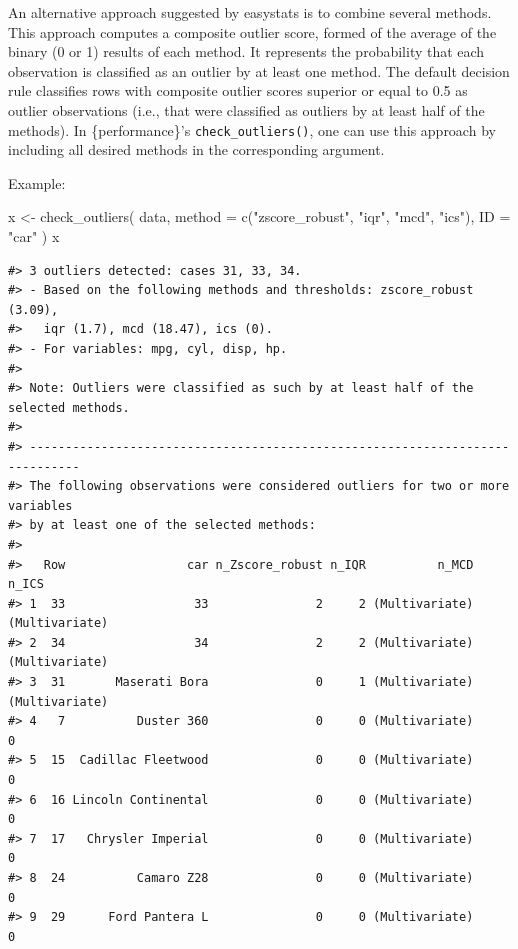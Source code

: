 \documentclass[
]{article}
\newenvironment{Shaded}{\begin{snugshade}}{\end{snugshade}}
\newcommand{\AttributeTok}[1]{\textcolor[rgb]{0.77,0.63,0.00}{#1}}
\newcommand{\FunctionTok}[1]{\textcolor[rgb]{0.00,0.00,0.00}{#1}}
\newcommand{\NormalTok}[1]{#1}
\newcommand{\OtherTok}[1]{\textcolor[rgb]{0.56,0.35,0.01}{#1}}
\newcommand{\StringTok}[1]{\textcolor[rgb]{0.31,0.60,0.02}{#1}}
\begin{document}
An alternative approach suggested by easystats is to combine several
methods. This approach computes a composite outlier score, formed of the
average of the binary (0 or 1) results of each method. It represents the
probability that each observation is classified as an outlier by at
least one method. The default decision rule classifies rows with
composite outlier scores superior or equal to 0.5 as outlier
observations (i.e., that were classified as outliers by at least half of
the methods). In \{performance\}'s \texttt{check\_outliers()}, one can
use this approach by including all desired methods in the corresponding
argument.

Example:

\begin{Shaded}
\begin{Highlighting}[]
\NormalTok{x }\OtherTok{\textless{}{-}} \FunctionTok{check\_outliers}\NormalTok{(}
\NormalTok{  data,}
  \AttributeTok{method =} \FunctionTok{c}\NormalTok{(}\StringTok{"zscore\_robust"}\NormalTok{, }\StringTok{"iqr"}\NormalTok{, }\StringTok{"mcd"}\NormalTok{, }\StringTok{"ics"}\NormalTok{),}
  \AttributeTok{ID =} \StringTok{"car"}
\NormalTok{)}
\NormalTok{x}
\end{Highlighting}
\end{Shaded}

\begin{verbatim}
#> 3 outliers detected: cases 31, 33, 34.
#> - Based on the following methods and thresholds: zscore_robust (3.09),
#>   iqr (1.7), mcd (18.47), ics (0).
#> - For variables: mpg, cyl, disp, hp.
#> 
#> Note: Outliers were classified as such by at least half of the selected methods. 
#> 
#> -----------------------------------------------------------------------------
#> The following observations were considered outliers for two or more variables 
#> by at least one of the selected methods: 
#> 
#>   Row                 car n_Zscore_robust n_IQR          n_MCD          n_ICS
#> 1  33                  33               2     2 (Multivariate) (Multivariate)
#> 2  34                  34               2     2 (Multivariate) (Multivariate)
#> 3  31       Maserati Bora               0     1 (Multivariate) (Multivariate)
#> 4   7          Duster 360               0     0 (Multivariate)              0
#> 5  15  Cadillac Fleetwood               0     0 (Multivariate)              0
#> 6  16 Lincoln Continental               0     0 (Multivariate)              0
#> 7  17   Chrysler Imperial               0     0 (Multivariate)              0
#> 8  24          Camaro Z28               0     0 (Multivariate)              0
#> 9  29      Ford Pantera L               0     0 (Multivariate)              0
\end{verbatim}
\end{document}
